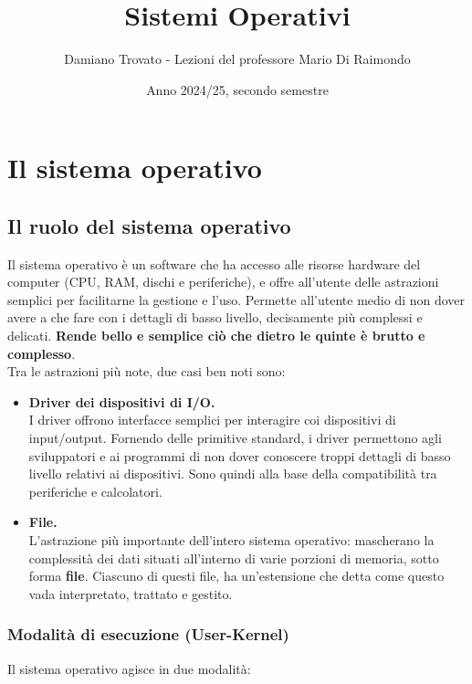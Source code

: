 \documentclass{report}
\title{\Huge \textbf{{Sistemi Operativi}}}
\author{Damiano Trovato - Lezioni del professore Mario Di Raimondo}
\date{Anno 2024/25, secondo semestre}
\begin{document}
\maketitle
\newpage
\tableofcontents
\newpage


\chapter{Il sistema operativo}

\section{Il ruolo del sistema operativo}
Il sistema operativo è un software che ha accesso alle risorse hardware del computer (CPU, RAM, dischi e periferiche), e offre all'utente delle astrazioni semplici per facilitarne la gestione e l'uso. Permette all'utente medio di non dover avere a che fare con i dettagli di basso livello, decisamente più complessi e delicati. \textbf{Rende bello e semplice ciò che dietro le quinte è brutto e complesso}.\\
Tra le astrazioni più note, due casi ben noti sono:
\begin{itemize}
    \item \textbf{Driver dei dispositivi di I/O.}\\
    I driver offrono interfacce semplici per interagire coi dispositivi di input/output. Fornendo delle primitive standard, i driver permettono agli sviluppatori e ai programmi di non dover conoscere troppi dettagli di basso livello relativi ai dispositivi. Sono quindi alla base della compatibilità tra periferiche e calcolatori.
    
    \item \textbf{File.}\\
    L'astrazione più importante dell'intero sistema operativo: mascherano la complessità dei dati situati all'interno di varie porzioni di memoria, sotto forma \textbf{file}. Ciascuno di questi file, ha un'estensione che detta come questo vada interpretato, trattato e gestito.
\end{itemize}

\subsection{Modalità di esecuzione (User-Kernel)}
Il sistema operativo agisce in due modalità:
\end{document}
